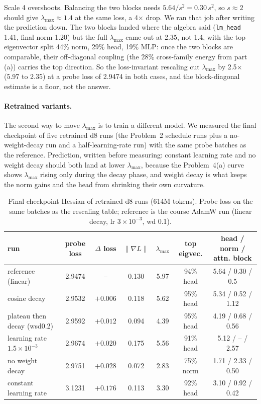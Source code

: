 \documentclass[10pt,letterpaper]{article}
\newcommand{\lmax}{\lambda_{\max}}
\begin{document}
Scale 4 overshoots. Balancing the two blocks needs $5.64/s^2 = 0.30\,s^2$, so $s\approx 2$ should give $\lmax\approx 1.4$ at the same loss, a 4$\times$ drop. We ran that job after writing the prediction down. The two blocks landed where the algebra said (\texttt{lm\_head} 1.41, final norm 1.20) but the full $\lmax$ came out at 2.35, not 1.4, with the top eigenvector split 44\% norm, 29\% head, 19\% MLP: once the two blocks are comparable, their off-diagonal coupling (the 28\% cross-family energy from part (a)) carries the top direction. So the loss-invariant rescaling cut $\lmax$ by 2.5$\times$ (5.97 to 2.35) at a probe loss of 2.9474 in both cases, and the block-diagonal estimate is a floor, not the answer.

\paragraph{Retrained variants.} The second way to move $\lmax$ is to train a different model. We measured the final checkpoint of five retrained d8 runs (the Problem~2 schedule runs plus a no-weight-decay run and a half-learning-rate run) with the same probe batches as the reference. Prediction, written before measuring: constant learning rate and no weight decay should both land at lower $\lmax$, because the Problem~4(a) curve shows $\lmax$ rising only during the decay phase, and weight decay is what keeps the norm gains and the head from shrinking their own curvature.

\begin{table}[h]\centering\caption{Final-checkpoint Hessian of retrained d8 runs (614M tokens). Probe loss on the same batches as the rescaling table; reference is the course AdamW run (linear decay, lr $3\times10^{-3}$, wd 0.1).}
\label{tab:p4b-train}
\small\begin{tabular}{lcccccc}\toprule
run & probe loss & $\Delta$ loss & $\|\nabla L\|$ & $\lmax$ & top eigvec. & head / norm / attn. block\\
\midrule
reference (linear) & 2.9474 & -- & 0.130 & 5.97 & 94\% head & 5.64 / 0.30 / 0.5\\
cosine decay & 2.9532 & $+0.006$ & 0.118 & 5.62 & 95\% head & 5.34 / 0.52 / 1.12\\
plateau then decay (wsd0.2) & 2.9592 & $+0.012$ & 0.094 & 4.39 & 95\% head & 4.19 / 0.68 / 0.56\\
learning rate $1.5\times10^{-3}$ & 2.9674 & $+0.020$ & 0.175 & 5.56 & 91\% head & 5.12 / -- / 2.57\\
no weight decay & 2.9751 & $+0.028$ & 0.072 & 2.83 & 75\% norm & 1.71 / 2.33 / 0.50\\
constant learning rate & 3.1231 & $+0.176$ & 0.113 & 3.30 & 92\% head & 3.10 / 0.92 / 0.42\\
\bottomrule\end{tabular}\end{table}
\end{document}
